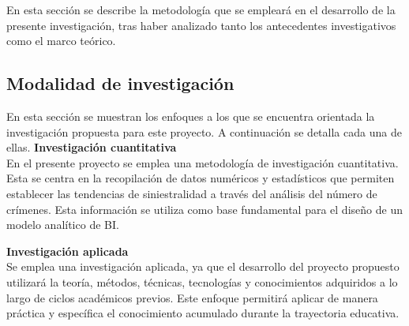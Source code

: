 En esta sección se describe la metodología que se empleará en el desarrollo de la presente investigación,
tras haber analizado tanto los antecedentes investigativos como el marco teórico.


\subsection{Modalidad de investigación}
En esta sección se muestran los enfoques a los que se encuentra orientada la investigación propuesta para este proyecto. A continuación se detalla
cada una de ellas.
\bigbreak
\textbf{Investigación cuantitativa}\\

En el presente proyecto se emplea una metodología de investigación cuantitativa. Esta se centra en la recopilación de
datos numéricos y estadísticos que permiten establecer las tendencias de siniestralidad a través del análisis del número
de crímenes. Esta información se utiliza como base fundamental para el diseño de un modelo analítico de BI.

\bigbreak
\textbf{Investigación aplicada}\\
Se emplea una investigación aplicada, ya que el desarrollo del proyecto propuesto utilizará la teoría, métodos,
técnicas, tecnologías y conocimientos adquiridos a lo largo de ciclos académicos previos. Este enfoque permitirá
aplicar de manera práctica y específica el conocimiento acumulado durante la trayectoria educativa.



